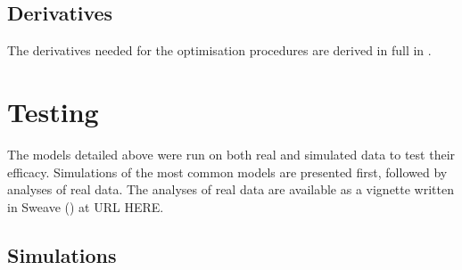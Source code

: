 \subsection{Derivatives}

The derivatives needed for the optimisation procedures are derived in full in .

\section{Testing}

The models detailed above were run on both real and simulated data to test their efficacy. Simulations of the most common models are presented first, followed by analyses of real data. The analyses of real data are available as a vignette written in Sweave (\cite{sweave}) at URL HERE.

\subsection{Simulations}

